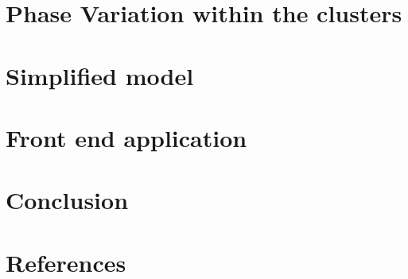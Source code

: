 \documentclass[twocolumn,10pt]{asme2ej}
\begin{document}
\section{Phase Variation within the clusters}

\noindent

\section{Simplified model}

\section{Front end application}

\section{Conclusion}


\section{References}
\end{document}
